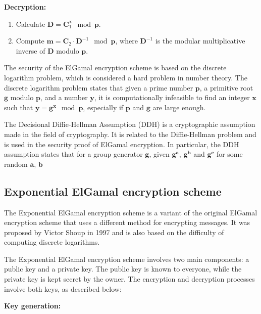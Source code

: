 \textbf{Decryption:}

\begin{enumerate}
    \item Calculate ${\boldsymbol{D}} = {\boldsymbol{C}}_1^{\boldsymbol{x}} \mod {\boldsymbol{p}}$.
    \item Compute ${\boldsymbol{m}} = {\boldsymbol{C}}_2 \cdot {\boldsymbol{D}}^{-1} \mod {\boldsymbol{p}}$, where ${\boldsymbol{D}}^{-1}$ is the modular multiplicative inverse of ${\boldsymbol{D}}$ modulo ${\boldsymbol{p}}$.
\end{enumerate}

The security of the ElGamal encryption scheme is based on the discrete logarithm problem, which is considered a hard problem in number theory. The discrete logarithm problem states that given a prime number $\boldsymbol{p}$, a primitive root $\boldsymbol{g}$ modulo $\boldsymbol{p}$, and a number $\boldsymbol{y}$, it is computationally infeasible to find an integer $\boldsymbol{x}$ such that $\boldsymbol{y} = \boldsymbol{g}^{\boldsymbol{x}} \mod \boldsymbol{p}$, especially if $\boldsymbol{p}$ and $\boldsymbol{g}$ are large enough.

The Decisional Diffie-Hellman Assumption (DDH) is a cryptographic assumption made in the field of cryptography. It is related to the Diffie-Hellman problem and is used in the security proof of ElGamal encryption. In particular, the DDH assumption states that for a group generator $\boldsymbol{g}$, given $\boldsymbol{g^a}$, $\boldsymbol{g^b}$ and $\boldsymbol{g^c}$ for some random $\boldsymbol{a}$, $\boldsymbol{b}$



\subsection{Exponential ElGamal encryption scheme}
The Exponential ElGamal encryption scheme is a variant of the original ElGamal encryption scheme that uses a different method for encrypting messages. It was proposed by Victor Shoup in 1997 \cite{Shoup:1997} and is also based on the difficulty of computing discrete logarithms.

The Exponential ElGamal encryption scheme involves two main components: a public key and a private key. The public key is known to everyone, while the private key is kept secret by the owner. The encryption and decryption processes involve both keys, as described below:

\textbf{Key generation:}


